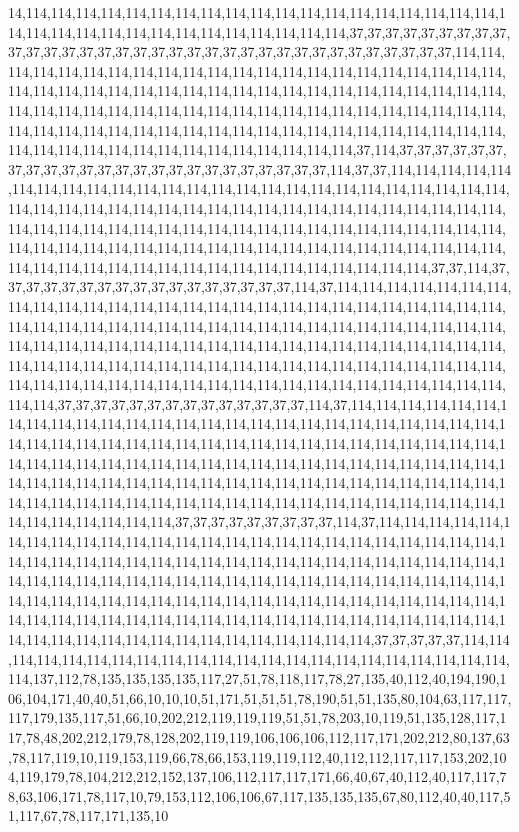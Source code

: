 14,114,114,114,114,114,114,114,114,114,114,114,114,114,114,114,114,114,114,114,114,114,114,114,114,114,114,114,114,114,114,114,114,114,37,37,37,37,37,37,37,37,37,37,37,37,37,37,37,37,37,37,37,37,37,37,37,37,37,37,37,37,37,37,37,37,37,37,114,114,114,114,114,114,114,114,114,114,114,114,114,114,114,114,114,114,114,114,114,114,114,114,114,114,114,114,114,114,114,114,114,114,114,114,114,114,114,114,114,114,114,114,114,114,114,114,114,114,114,114,114,114,114,114,114,114,114,114,114,114,114,114,114,114,114,114,114,114,114,114,114,114,114,114,114,114,114,114,114,114,114,114,114,114,114,114,114,114,114,114,114,114,114,114,37,114,37,37,37,37,37,37,37,37,37,37,37,37,37,37,37,37,37,37,37,37,37,37,37,37,114,37,37,114,114,114,114,114,114,114,114,114,114,114,114,114,114,114,114,114,114,114,114,114,114,114,114,114,114,114,114,114,114,114,114,114,114,114,114,114,114,114,114,114,114,114,114,114,114,114,114,114,114,114,114,114,114,114,114,114,114,114,114,114,114,114,114,114,114,114,114,114,114,114,114,114,114,114,114,114,114,114,114,114,114,114,114,114,114,114,114,114,114,114,114,114,114,114,114,114,114,114,114,114,114,37,37,114,37,37,37,37,37,37,37,37,37,37,37,37,37,37,37,37,37,114,37,114,114,114,114,114,114,114,114,114,114,114,114,114,114,114,114,114,114,114,114,114,114,114,114,114,114,114,114,114,114,114,114,114,114,114,114,114,114,114,114,114,114,114,114,114,114,114,114,114,114,114,114,114,114,114,114,114,114,114,114,114,114,114,114,114,114,114,114,114,114,114,114,114,114,114,114,114,114,114,114,114,114,114,114,114,114,114,114,114,114,114,114,114,114,114,114,114,114,114,114,114,114,114,114,114,114,114,114,114,37,37,37,37,37,37,37,37,37,37,37,37,37,37,114,37,114,114,114,114,114,114,114,114,114,114,114,114,114,114,114,114,114,114,114,114,114,114,114,114,114,114,114,114,114,114,114,114,114,114,114,114,114,114,114,114,114,114,114,114,114,114,114,114,114,114,114,114,114,114,114,114,114,114,114,114,114,114,114,114,114,114,114,114,114,114,114,114,114,114,114,114,114,114,114,114,114,114,114,114,114,114,114,114,114,114,114,114,114,114,114,114,114,114,114,114,114,114,114,114,114,114,114,114,114,114,114,114,114,37,37,37,37,37,37,37,37,37,114,37,114,114,114,114,114,114,114,114,114,114,114,114,114,114,114,114,114,114,114,114,114,114,114,114,114,114,114,114,114,114,114,114,114,114,114,114,114,114,114,114,114,114,114,114,114,114,114,114,114,114,114,114,114,114,114,114,114,114,114,114,114,114,114,114,114,114,114,114,114,114,114,114,114,114,114,114,114,114,114,114,114,114,114,114,114,114,114,114,114,114,114,114,114,114,114,114,114,114,114,114,114,114,114,114,114,114,114,114,114,114,114,114,114,114,114,114,114,114,114,114,37,37,37,37,37,114,114,114,114,114,114,114,114,114,114,114,114,114,114,114,114,114,114,114,114,114,114,114,137,112,78,135,135,135,135,117,27,51,78,118,117,78,27,135,40,112,40,194,190,106,104,171,40,40,51,66,10,10,10,51,171,51,51,51,78,190,51,51,135,80,104,63,117,117,117,179,135,117,51,66,10,202,212,119,119,119,51,51,78,203,10,119,51,135,128,117,117,78,48,202,212,179,78,128,202,119,119,106,106,106,112,117,171,202,212,80,137,63,78,117,119,10,119,153,119,66,78,66,153,119,119,112,40,112,112,117,117,153,202,104,119,179,78,104,212,212,152,137,106,112,117,117,171,66,40,67,40,112,40,117,117,78,63,106,171,78,117,10,79,153,112,106,106,67,117,135,135,135,67,80,112,40,40,117,51,117,67,78,117,171,135,10